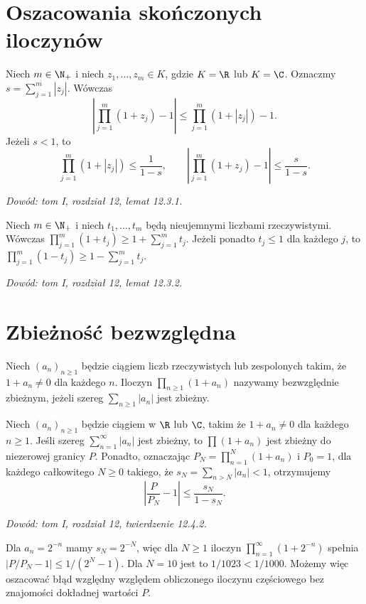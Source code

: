 \section{Oszacowania skończonych iloczynów}
\begin{lemat}
\label{ma1:lem:product-finite-estimate}
Niech $m\in\N_+$ i niech $z_1,\ldots,z_m\in K$, gdzie $K=\R$ lub $K=\C$. Oznaczmy $s=\sum_{j=1}^m|z_j|$. Wówczas
\[
 \left|\prod_{j=1}^m(1+z_j)-1\right|
 \le \prod_{j=1}^m(1+|z_j|)-1.
\]
Jeżeli $s<1$, to
\[
 \prod_{j=1}^m(1+|z_j|)\le\frac1{1-s},
 \qquad
 \left|\prod_{j=1}^m(1+z_j)-1\right|
 \le\frac{s}{1-s}.
\]
\end{lemat}
\emph{Dowód: tom I, rozdział 12, lemat 12.3.1.}

\begin{lemat}
\label{ma1:lem:positive-product-bound}
Niech $m\in\N_+$ i niech $t_1,\ldots,t_m$ będą nieujemnymi liczbami rzeczywistymi. Wówczas
$\prod_{j=1}^m(1+t_j)\ge1+\sum_{j=1}^m t_j$.
Jeżeli ponadto $t_j\le1$ dla każdego $j$, to
$\prod_{j=1}^m(1-t_j)\ge1-\sum_{j=1}^m t_j$.
\end{lemat}
\emph{Dowód: tom I, rozdział 12, lemat 12.3.2.}

\section{Zbieżność bezwzględna}
\begin{definicja}
\label{ma1:def:absolute-product}
Niech $(a_n)_{n\ge1}$ będzie ciągiem liczb rzeczywistych lub zespolonych takim, że $1+a_n\ne0$ dla każdego $n$. Iloczyn $\prod_{n\ge1}(1+a_n)$ nazywamy bezwzględnie zbieżnym, jeżeli szereg $\sum_{n\ge1}|a_n|$ jest zbieżny.
\end{definicja}
\begin{twierdzenie}
\label{ma1:thm:absolute-product}
Niech $(a_n)_{n\ge1}$ będzie ciągiem w $\R$ lub $\C$, takim że $1+a_n\ne0$ dla każdego $n\ge1$. Jeśli szereg $\sum_{n=1}^\infty|a_n|$ jest zbieżny, to $\prod(1+a_n)$ jest zbieżny do niezerowej granicy $P$. Ponadto, oznaczając $P_N=\prod_{n=1}^N(1+a_n)$ i $P_0=1$, dla każdego całkowitego $N\ge0$ takiego, że $s_N=\sum_{n>N}|a_n|<1$, otrzymujemy
\[
 \left|\frac{P}{P_N}-1\right|\le\frac{s_N}{1-s_N}.
\]
\end{twierdzenie}
\emph{Dowód: tom I, rozdział 12, twierdzenie 12.4.2.}
\begin{przyklad}
Dla $a_n=2^{-n}$ mamy $s_N=2^{-N}$, więc dla $N\ge1$ iloczyn $\prod_{n=1}^\infty(1+2^{-n})$ spełnia
$|P/P_N-1|\le1/(2^N-1)$. Dla $N=10$ jest to $1/1023<1/1000$. Możemy więc oszacować błąd względny względem obliczonego iloczynu częściowego bez znajomości dokładnej wartości $P$.
\end{przyklad}


